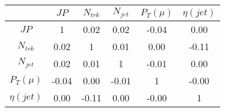 \begin{tabular}{|c|c|c|c|c|c|} 
\hline
 & $JP$ & $N_{trk}$ & $N_{jet}$ & $P_{T} (\mu)$ & $\eta (jet)$ \\ \hline
$JP$ & 1 & 0.02 & 0.02 & -0.04 & 0.00 \\
$N_{trk}$ & 0.02 & 1 & 0.01 & 0.00 & -0.11 \\
$N_{jet}$ & 0.02 & 0.01 & 1 & -0.01 & 0.00 \\
$P_{T} (\mu)$ & -0.04 & 0.00 & -0.01 & 1 & -0.00 \\
$\eta (jet)$ & 0.00 & -0.11 & 0.00 & -0.00 & 1 \\
\hline 
\end{tabular} 



